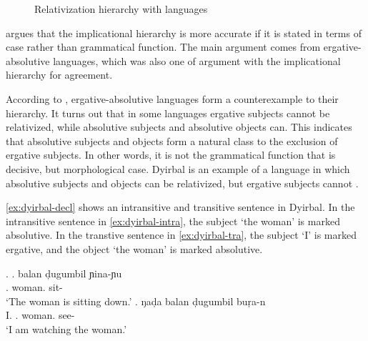  \begin{figure}[ht]
   \centering
   \caption{Relativization hierarchy with languages}
   \label{fig:rel-sub-do-io-lang}
 \end{figure}

\citet{caha2009} argues that the implicational hierarchy is more accurate if it is stated in terms of case rather than grammatical function. The main argument comes from ergative-absolutive languages, which was also one of  argument with the implicational hierarchy for agreement.

According to \citet{keenan1977}, ergative-absolutive languages form a counterexample to their hierarchy. It turns out that in some languages ergative subjects cannot be relativized, while absolutive subjects and absolutive objects can. This indicates that absolutive subjects and objects form a natural class to the exclusion of ergative subjects. In other words, it is not the grammatical function that is decisive, but morphological case. Dyirbal is an example of a language in which absolutive subjects and objects can be relativized, but ergative subjects cannot .

\ref{ex:dyirbal-decl} shows an intransitive and transitive sentence in Dyirbal. In the intransitive sentence in \ref{ex:dyirbal-intra}, the subject  `the woman' is marked absolutive. In the transtive sentence in \ref{ex:dyirbal-tra}, the subject  `I' is marked ergative, and the object  `the woman' is marked absolutive.

\ex.\label{ex:dyirbal-decl}
\ag. balan d̦ugumbil ɲina-ɲu\\
 . woman. sit-\\
 `The woman is sitting down.'\label{ex:dyirbal-intra}
\bg. ŋad̦a balan d̦ugumbil buŗa-n\\
 I. . woman. see-\\
 `I am watching the woman.'\label{ex:dyirbal-tra}

